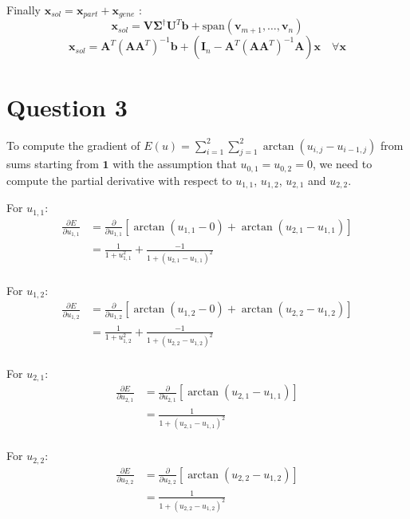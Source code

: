 \documentclass{article}
\begin{document}
Finally $\mathbf{x}_{sol}=\mathbf{x}_{part}+\mathbf{x}_{gene}$ :
\begin{equation}
\boxed{
\mathbf{x}_{sol}=\mathbf{V}  \boldsymbol{\Sigma}^\dagger \mathbf{U}^T \mathbf{b}+\text{span}(\mathbf{v}_{m+1}, \dots , \mathbf{v}_{n}) 
}
\end{equation}
\begin{equation}
\boxed{
\mathbf{x}_{sol}=\mathbf{A}^T (\mathbf{A} \mathbf{A}^T)^{-1}\mathbf{b}+(\mathbf{I}_n-\mathbf{A}^T (\mathbf{A} \mathbf{A}^T)^{-1} \mathbf{A})\mathbf{x} \quad \forall \mathbf{x}
}
\end{equation}

\section{Question 3}

To compute the gradient of $E(u) = \sum_{i=1}^{2} \sum_{j=1}^{2} \arctan(u_{i,j} - u_{i-1,j})$ from sums starting from $\mathbf{1}$ with the assumption that $u_{0,1}=u_{0,2}=0$, we need to compute the partial derivative with respect to $u_{1,1}$, $u_{1,2}$, $u_{2,1}$ and $u_{2,2}$.

For $u_{1,1}$:
\begin{align*}
\frac{\partial E}{\partial u_{1,1}} &= \frac{\partial}{\partial u_{1,1}} \left[ \arctan(u_{1,1} - 0) + \arctan(u_{2,1} - u_{1,1}) \right]\\
&= \frac{1}{1+u_{1,1}^2}  + \frac{-1}{1+(u_{2,1}-u_{1,1})^2} \\
\end{align*}

For $u_{1,2}$:
\begin{align*}
\frac{\partial E}{\partial u_{1,2}} &= \frac{\partial}{\partial u_{1,2}} \left[ \arctan(u_{1,2} - 0) + \arctan(u_{2,2} - u_{1,2}) \right]\\
&= \frac{1}{1+u_{1,2}^2}  + \frac{-1}{1+(u_{2,2}-u_{1,2})^2} \\
\end{align*}

For $u_{2,1}$:
\begin{align*}
\frac{\partial E}{\partial u_{2,1}} &= \frac{\partial}{\partial u_{2,1}} \left[ \arctan(u_{2,1} - u_{1,1}) \right]\\
&=  \frac{1}{1+(u_{2,1}-u_{1,1})^2} \\
\end{align*}

For $u_{2,2}$:
\begin{align*}
\frac{\partial E}{\partial u_{2,2}} &= \frac{\partial}{\partial u_{2,2}} \left[ \arctan(u_{2,2} - u_{1,2}) \right]\\
&=  \frac{1}{1+(u_{2,2}-u_{1,2})^2} \\
\end{align*}
\end{document}
